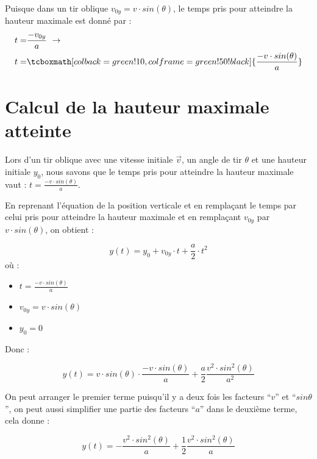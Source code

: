 Puisque dans un tir oblique \(v_{0y}=v \cdot sin(\theta)\), le temps pris pour atteindre la hauteur maximale est donné par :
\begin{align}
    t = & \frac{-v_{0y}}{a} \ \rightarrow                                                      \\
    t = & \tcboxmath[colback=green!10,colframe=green!50!black]{\frac{-v \cdot sin(\theta)}{a}}
\end{align}

\newpage

\section{Calcul de la hauteur maximale atteinte}
Lors d'un tir oblique avec une vitesse initiale \(\vec{v}\), un angle de tir \(\theta\) et une hauteur initiale \(y_0\), nous savons que le temps pris pour atteindre la hauteur maximale vaut : \(t=\frac{-v \cdot sin(\theta)}{a}\).

En reprenant l'équation de la position verticale et en remplaçant le temps par celui pris pour atteindre la hauteur maximale et en remplaçant \(v_{0y}\) par \(v \cdot sin(\theta)\), on obtient :

\begin{equation}
    y(t)=y_0 + v_{0y} \cdot t + \frac{a}{2} \cdot t^2
\end{equation} où :

\begin{itemize}[label=\textbullet]
    \item \(t=\frac{-v \cdot sin(\theta)}{a}\)
    \item \(v_{0y}=v \cdot sin(\theta)\)
    \item \(y_0=0\)
\end{itemize}

Donc :

\begin{equation}
    y(t)=v \cdot sin(\theta) \cdot \frac{-v \cdot sin(\theta)}{a} + \frac{a}{2} \frac{v^2 \cdot sin^2(\theta)}{a^2}
\end{equation}

On peut arranger le premier terme puisqu'il y a deux fois les facteurs \enquote{\(v\)} et \enquote{\(sin \theta\)}, on peut aussi simplifier une partie des facteurs \enquote{\(a\)} dans le deuxième terme, cela donne :

\begin{equation}
    y(t)=- \frac{v^2 \cdot sin^2(\theta)}{a} + \frac{1}{2} \frac{v^2 \cdot sin^2(\theta)}{a}
\end{equation}

